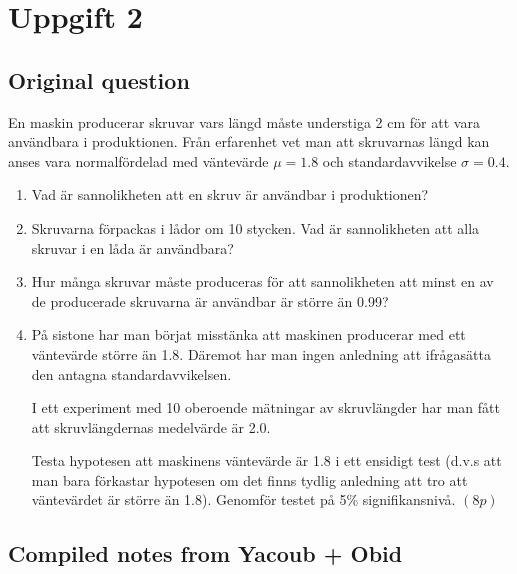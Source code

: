 \documentclass[10pt]{article}
\begin{document}
\section*{Uppgift 2}

\subsection*{Original question}

En maskin producerar skruvar vars längd måste
understiga 2 cm för att vara användbara i
produktionen. Från erfarenhet vet man att skruvarnas
längd kan anses vara normalfördelad med väntevärde
\(\mu=1.8\) och standardavvikelse \(\sigma=0.4\).

\begin{enumerate}[label=\alph*)]
\item Vad är sannolikheten att en skruv är användbar
i produktionen?

\item Skruvarna förpackas i lådor om 10 stycken.
Vad är sannolikheten att alla skruvar i en låda är
användbara?

\item Hur många skruvar måste produceras för att
sannolikheten att minst en av de producerade
skruvarna är användbar är större än 0.99?

\item På sistone har man börjat misstänka att
maskinen producerar med ett väntevärde större än
1.8. Däremot har man ingen anledning att ifrågasätta
den antagna standardavvikelsen.

I ett experiment med 10 oberoende mätningar av
skruvlängder har man fått att skruvlängdernas
medelvärde är 2.0.

Testa hypotesen att maskinens väntevärde är 1.8 i
ett ensidigt test (d.v.s att man bara förkastar
hypotesen om det finns tydlig anledning att tro att
väntevärdet är större än 1.8). Genomför testet på
5\% signifikansnivå. \((8p)\)
\end{enumerate}

\subsection*{Compiled notes from Yacoub + Obid}
\end{document}
